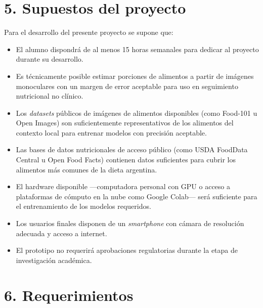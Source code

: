 \documentclass[
11pt, %
]{charter}
\begin{document}
\section{5. Supuestos del proyecto}
\label{sec:supuestos}

Para el desarrollo del presente proyecto se supone que:

\begin{itemize}
	\item El alumno dispondrá de al menos 15 horas semanales para dedicar al proyecto durante su desarrollo.
	\item Es técnicamente posible estimar porciones de alimentos a partir de imágenes monoculares con un margen de error aceptable para uso en seguimiento nutricional no clínico.
	\item Los \textit{datasets} públicos de imágenes de alimentos disponibles (como Food-101 u Open Images) son suficientemente representativos de los alimentos del contexto local para entrenar modelos con precisión aceptable.
	\item Las bases de datos nutricionales de acceso público (como USDA FoodData Central u Open Food Facts) contienen datos suficientes para cubrir los alimentos más comunes de la dieta argentina.
	\item El hardware disponible —computadora personal con GPU o acceso a plataformas de cómputo en la nube como Google Colab— será suficiente para el entrenamiento de los modelos requeridos.
	\item Los usuarios finales disponen de un \textit{smartphone} con cámara de resolución adecuada y acceso a internet.
	\item El prototipo no requerirá aprobaciones regulatorias durante la etapa de investigación académica.
\end{itemize}

\section{6. Requerimientos}
\label{sec:requerimientos}
\end{document}
